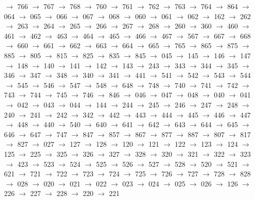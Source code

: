 $\rightarrow$ 766 $\rightarrow$ 767 $\rightarrow$ 768 $\rightarrow$ 760 $\rightarrow$ 761 $\rightarrow$ 762 $\rightarrow$ 763 $\rightarrow$ 764 $\rightarrow$ 864 $\rightarrow$ 064 $\rightarrow$ 065 $\rightarrow$ 066 $\rightarrow$ 067 $\rightarrow$ 068 $\rightarrow$ 060 $\rightarrow$ 061 $\rightarrow$ 062 $\rightarrow$ 162 $\rightarrow$ 262 $\rightarrow$ 263 $\rightarrow$ 264 $\rightarrow$ 265 $\rightarrow$ 266 $\rightarrow$ 267 $\rightarrow$ 268 $\rightarrow$ 260 $\rightarrow$ 360 $\rightarrow$ 460 $\rightarrow$ 461 $\rightarrow$ 462 $\rightarrow$ 463 $\rightarrow$ 464 $\rightarrow$ 465 $\rightarrow$ 466 $\rightarrow$ 467 $\rightarrow$ 567 $\rightarrow$ 667 $\rightarrow$ 668 $\rightarrow$ 660 $\rightarrow$ 661 $\rightarrow$ 662 $\rightarrow$ 663 $\rightarrow$ 664 $\rightarrow$ 665 $\rightarrow$ 765 $\rightarrow$ 865 $\rightarrow$ 875 $\rightarrow$ 885 $\rightarrow$ 805 $\rightarrow$ 815 $\rightarrow$ 825 $\rightarrow$ 835 $\rightarrow$ 845 $\rightarrow$ 045 $\rightarrow$ 145 $\rightarrow$ 146 $\rightarrow$ 147 $\rightarrow$ 148 $\rightarrow$ 140 $\rightarrow$ 141 $\rightarrow$ 142 $\rightarrow$ 143 $\rightarrow$ 243 $\rightarrow$ 343 $\rightarrow$ 344 $\rightarrow$ 345 $\rightarrow$ 346 $\rightarrow$ 347 $\rightarrow$ 348 $\rightarrow$ 340 $\rightarrow$ 341 $\rightarrow$ 441 $\rightarrow$ 541 $\rightarrow$ 542 $\rightarrow$ 543 $\rightarrow$ 544 $\rightarrow$ 545 $\rightarrow$ 546 $\rightarrow$ 547 $\rightarrow$ 548 $\rightarrow$ 648 $\rightarrow$ 748 $\rightarrow$ 740 $\rightarrow$ 741 $\rightarrow$ 742 $\rightarrow$ 743 $\rightarrow$ 744 $\rightarrow$ 745 $\rightarrow$ 746 $\rightarrow$ 846 $\rightarrow$ 046 $\rightarrow$ 047 $\rightarrow$ 048 $\rightarrow$ 040 $\rightarrow$ 041 $\rightarrow$ 042 $\rightarrow$ 043 $\rightarrow$ 044 $\rightarrow$ 144 $\rightarrow$ 244 $\rightarrow$ 245 $\rightarrow$ 246 $\rightarrow$ 247 $\rightarrow$ 248 $\rightarrow$ 240 $\rightarrow$ 241 $\rightarrow$ 242 $\rightarrow$ 342 $\rightarrow$ 442 $\rightarrow$ 443 $\rightarrow$ 444 $\rightarrow$ 445 $\rightarrow$ 446 $\rightarrow$ 447 $\rightarrow$ 448 $\rightarrow$ 440 $\rightarrow$ 540 $\rightarrow$ 640 $\rightarrow$ 641 $\rightarrow$ 642 $\rightarrow$ 643 $\rightarrow$ 644 $\rightarrow$ 645 $\rightarrow$ 646 $\rightarrow$ 647 $\rightarrow$ 747 $\rightarrow$ 847 $\rightarrow$ 857 $\rightarrow$ 867 $\rightarrow$ 877 $\rightarrow$ 887 $\rightarrow$ 807 $\rightarrow$ 817 $\rightarrow$ 827 $\rightarrow$ 027 $\rightarrow$ 127 $\rightarrow$ 128 $\rightarrow$ 120 $\rightarrow$ 121 $\rightarrow$ 122 $\rightarrow$ 123 $\rightarrow$ 124 $\rightarrow$ 125 $\rightarrow$ 225 $\rightarrow$ 325 $\rightarrow$ 326 $\rightarrow$ 327 $\rightarrow$ 328 $\rightarrow$ 320 $\rightarrow$ 321 $\rightarrow$ 322 $\rightarrow$ 323 $\rightarrow$ 423 $\rightarrow$ 523 $\rightarrow$ 524 $\rightarrow$ 525 $\rightarrow$ 526 $\rightarrow$ 527 $\rightarrow$ 528 $\rightarrow$ 520 $\rightarrow$ 521 $\rightarrow$ 621 $\rightarrow$ 721 $\rightarrow$ 722 $\rightarrow$ 723 $\rightarrow$ 724 $\rightarrow$ 725 $\rightarrow$ 726 $\rightarrow$ 727 $\rightarrow$ 728 $\rightarrow$ 828 $\rightarrow$ 028 $\rightarrow$ 020 $\rightarrow$ 021 $\rightarrow$ 022 $\rightarrow$ 023 $\rightarrow$ 024 $\rightarrow$ 025 $\rightarrow$ 026 $\rightarrow$ 126 $\rightarrow$ 226 $\rightarrow$ 227 $\rightarrow$ 228 $\rightarrow$ 220 $\rightarrow$ 221 